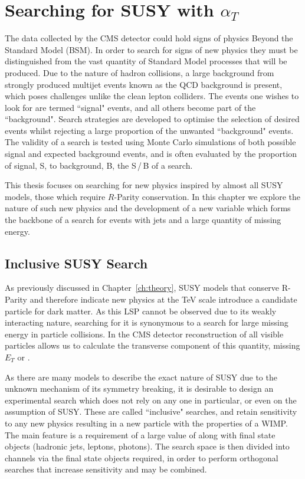 \chapter{Searching for SUSY with $\alpha_{T}$}
\label{ch:at}

The data collected by the CMS detector could hold signs of physics Beyond the Standard Model (BSM). In order to search for signs of new physics they must be distinguished from the vast quantity of Standard Model processes that will be produced. Due to the nature of hadron collisions, a large background from strongly produced multijet events known as the QCD background is present, which poses challenges unlike the clean lepton colliders. The events one wishes to look for are termed ``signal" events, and all others become part of the ``background". Search strategies are developed to optimise the selection of desired events whilst rejecting a large proportion of the unwanted ``background" events. The validity of a search is tested using Monte Carlo simulations of both possible signal and expected background events, and is often evaluated by the proportion of signal, S, to background, B, the S\,/\,B of a search. 

This thesis focuses on searching for new physics inspired by almost all SUSY models, those which require $R$-Parity conservation. In this chapter we explore the nature of such new physics and the development of a new variable \alt which forms the backbone of a search for events with jets and a large quantity of missing energy. 

\section{Inclusive SUSY Search}

As previously discussed in Chapter~\ref{ch:theory}, SUSY models that conserve R-Parity and therefore indicate new physics at the TeV scale introduce a candidate particle for dark matter. As this LSP cannot be observed due to its weakly interacting nature, searching for it is synonymous to a search for large missing energy in particle collisions. In the CMS detector reconstruction of all visible particles allows us to calculate the transverse component of this quantity, missing $E_{T}$ or \met. 

As there are many models to describe the exact nature of SUSY due to the unknown mechanism of its symmetry breaking, it is desirable to design an experimental search which does not rely on any one in particular, or even on the assumption of SUSY. These are called ``inclusive" searches, and retain sensitivity to any new physics resulting in a new particle with the properties of a WIMP. The main feature is a requirement of a large value of \met along with final state objects (hadronic jets, leptons, photons). The search space is then divided into channels via the final state objects required, in order to perform orthogonal searches that increase sensitivity and may be combined.

